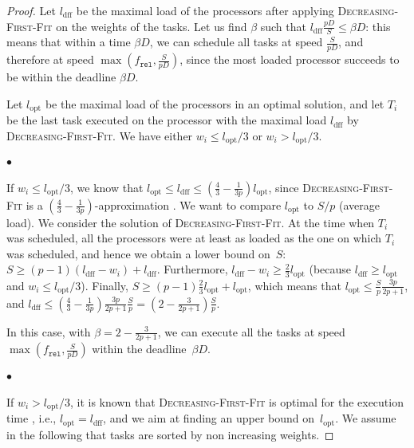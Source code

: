 \documentclass[a4paper]{article}
\theoremstyle{plain}
\theoremstyle{definition}
\theoremstyle{remark}
\newcommand{\fr}{\ensuremath{f_{\texttt{rel}}}\xspace}
\newcommand{\dff}{\textsc{Dec\-reasing-First-Fit}\xspace}
\let\ab\allowbreak
\begin{document}
\begin{proof}
Let $l_{\text{dff}}$ be the maximal load of the processors after
applying \dff on the weights of the tasks.  Let us find $\beta$ such
that $l_{\text{dff}}\frac{pD}{S} \leq \beta D$: this means that within
a time $\beta D$, we can schedule all tasks at speed $\frac{S}{pD}$, and therefore at speed $\max(\fr, \ab
\frac{S}{pD})$, since the most loaded processor succeeds to be within
the deadline $\beta D$.

Let $l_{\text{opt}}$ be the maximal load of the processors in an
optimal solution, and let $T_i$ be the last task executed on the
processor with the maximal load $l_{\text{dff}}$ by \dff. We have
either $w_i\leq l_{\text{opt}}/3$ or $w_i> l_{\text{opt}}/3$. 


\paragraph{$\bullet$} If $w_i \leq l_{\text{opt}}/3$, we know that
$l_{\text{opt}} \!\leq\! l_{\text{dff}} \!\leq\! \left(\! \frac{4}{3} \!-\!
  \frac{1}{3p}\! \right)l_{\text{opt}}$, since \dff is a $\left(
  \frac{4}{3} - \frac{1}{3p} \right)$-approxi\-mation
\cite{Graham69}. 
We want to compare $l_{\text{opt}}$ to $S / p$ (average load).  We
consider the solution of \dff. At the time when $T_i$ was scheduled,
all the processors were at least as loaded as the one on which $T_i$
was scheduled, and hence we obtain a lower bound on~$S$: $S \geq
(p-1)(l_{\text{dff}}-w_i) + l_{\text{dff}}$.  Furthermore,
$l_{\text{dff}}-w_i \geq \frac{2}{3} l_{\text{opt}}$ (because
$l_{\text{dff}}\geq l_{\text{opt}}$ and $w_i \leq l_{\text{opt}}/3$).
Finally, $S \geq (p-1)\frac23 l_{\text{opt}} + l_{\text{opt}}$, which
means that $l_{\text{opt}} \leq \frac{S}{p} \frac{3p}{2p+1}$, and
$l_{\text{dff}} \leq \left ( \frac{4}{3} - \frac{1}{3p} \right
)\frac{3p}{2p+1}\frac{S}{p} =  \left(2-\frac{3}{2p+1}\right)\frac{S}{p}$.

In this case, with $\beta = 2-\frac{3}{2p+1}$, we can execute all the
tasks at speed
$\max(\fr,\frac{S}{pD})$ within the deadline~$\beta D$.


\paragraph{$\bullet$} 
If $w_i > l_{\text{opt}}/3$, it is known that \dff is optimal for the execution time
\cite{Graham69}, i.e., $l_{\text{opt}} = l_{\text{dff}}$, and we aim
at finding an upper bound on~$l_{\text{opt}}$.  We assume in the
following that tasks are sorted by non increasing weights.


\end{proof}
\end{document}
